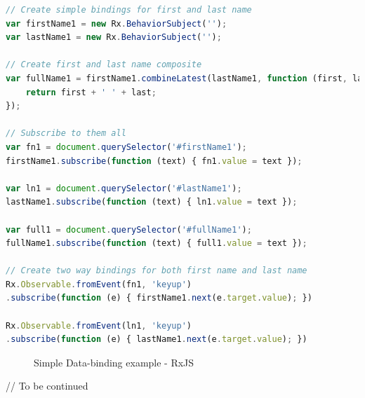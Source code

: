 \begin{lstlisting}[language=JavaScript, caption=RxJS - Databinding example, label={lst:rxjs-data-binding}]
// Create simple bindings for first and last name
var firstName1 = new Rx.BehaviorSubject('');
var lastName1 = new Rx.BehaviorSubject('');

// Create first and last name composite
var fullName1 = firstName1.combineLatest(lastName1, function (first, last) {
	return first + ' ' + last;
});

// Subscribe to them all
var fn1 = document.querySelector('#firstName1');
firstName1.subscribe(function (text) { fn1.value = text });

var ln1 = document.querySelector('#lastName1');
lastName1.subscribe(function (text) { ln1.value = text });

var full1 = document.querySelector('#fullName1');
fullName1.subscribe(function (text) { full1.value = text });

// Create two way bindings for both first name and last name
Rx.Observable.fromEvent(fn1, 'keyup')
.subscribe(function (e) { firstName1.next(e.target.value); })

Rx.Observable.fromEvent(ln1, 'keyup')
.subscribe(function (e) { lastName1.next(e.target.value); })
\end{lstlisting}


\begin{figure}[!h]
	\centering
	\hfill
	\caption{Simple Data-binding example - RxJS}
\end{figure}

// To be continued